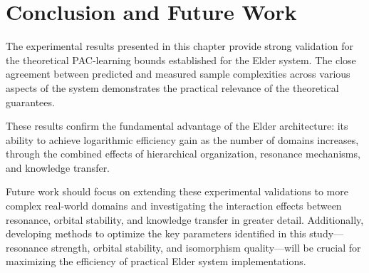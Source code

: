 \section{Conclusion and Future Work}

The experimental results presented in this chapter provide strong validation for the theoretical PAC-learning bounds established for the Elder system. The close agreement between predicted and measured sample complexities across various aspects of the system demonstrates the practical relevance of the theoretical guarantees.

These results confirm the fundamental advantage of the Elder architecture: its ability to achieve logarithmic efficiency gain as the number of domains increases, through the combined effects of hierarchical organization, resonance mechanisms, and knowledge transfer.

Future work should focus on extending these experimental validations to more complex real-world domains and investigating the interaction effects between resonance, orbital stability, and knowledge transfer in greater detail. Additionally, developing methods to optimize the key parameters identified in this study—resonance strength, orbital stability, and isomorphism quality—will be crucial for maximizing the efficiency of practical Elder system implementations.